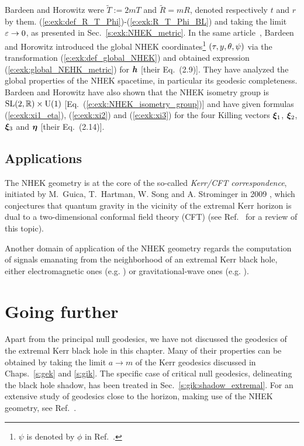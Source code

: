 \begin{hist}
{Bardeen and Horowitz were $\tilde{T} := 2m T$ and $\tilde{R} = m R$, denoted
respectively $t$ and $r$ by them.}  (\ref{e:exk:def_R_T_Phi})-(\ref{e:exk:R_T_Phi_BL}) and taking the limit $\varepsilon\to 0$, as presented in
Sec.~\ref{s:exk:NHEK_metric}. In the same article~\cite{BardeH99},
Bardeen and Horowitz introduced
the global NHEK coordinates\footnote{$\psi$ is denoted by $\phi$ in Ref.~\cite{BardeH99}.}
$(\tau,y,\theta,\psi)$ via the transformation (\ref{e:exk:def_global_NHEK})
and obtained expression (\ref{e:exk:global_NEHK_metric}) for $\bm{h}$ [their Eq.~(2.9)]. They have
analyzed the global properties of the NHEK spacetime, in particular its geodesic completeness.
Bardeen and Horowitz have also shown that the NHEK isometry group is
$\mathrm{SL}(2,\mathbb{R})\times \mathrm{U}(1)$ [Eq.~(\ref{e:exk:NHEK_isometry_group})]
and have given formulas (\ref{e:exk:xi1_eta}), (\ref{e:exk:xi2}) and (\ref{e:exk:xi3})
for the four Killing vectors $\bm{\xi}_1$, $\bm{\xi}_2$, $\bm{\xi}_3$ and $\bm{\eta}$
[their Eq.~(2.14)].
\end{hist}

\subsection{Applications}

The NHEK geometry is at the core of the so-called \emph{Kerr/CFT correspondence}, initiated by M.~Guica, T.~Hartman, W. Song and A. Strominger in 2009 \cite{GuicaHSS09}, which conjectures that quantum gravity
in the vicinity of the extremal Kerr horizon is dual to a two-dimensional
conformal field theory (CFT)
(see Ref.~\cite{Compe17} for a review of this topic).

Another domain of application of the NHEK geometry regards the computation
of signals emanating from the neighborhood
of an extremal Kerr black hole, either
electromagnetic ones (e.g. \cite{GrallLS18,CompeD20,KapecL20})
or gravitational-wave ones (e.g. \cite{CompeFHL18,GrallPW15}).

\section{Going further}

Apart from the principal null geodesics, we have not discussed the geodesics
of the extremal Kerr black hole in this chapter. Many of their properties
can be obtained by taking the limit $a\to m$ of the Kerr geodesics discussed
in Chaps.~\ref{s:gek} and \ref{s:gik}. The specific case of critical null
geodesics, delineating the black hole shadow, has been treated in Sec.~\ref{s:gik:shadow_extremal}.
For an extensive study of geodesics close to the horizon, making use of the NHEK geometry,
see Ref.~\cite{KapecL20,CompeD20}.

